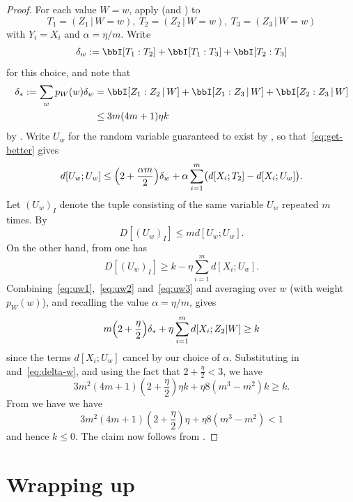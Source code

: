 \begin{proof}\leanok For each value $W=w$, apply  (and ) to
  \[
    T_1 = (Z_1 \,|\, W \mathop{=} w),\
    T_2 = (Z_2 \,|\, W \mathop{=} w),\
    T_3 = (Z_3 \,|\, W \mathop{=} w)
  \]
  with $Y_i=X_i$ and $\alpha=\eta/m$.  Write
  \[
    \delta_w :=  \bbI[T_1 : T_2] + \bbI[T_1 : T_3] + \bbI[T_2 : T_3]
  \]
  for this choice, and note that
  \begin{align}
    \label{eq:delta-w}
    \nonumber
    \delta_\ast := \sum_w p_W(w) \delta_w &= \bbI[Z_1 : Z_2 \,|\, W] + \bbI[Z_1 : Z_3 \,|\, W] + \bbI[Z_2 : Z_3 \,|\, W] \\
                           & \leq 3 m (4m+1) \eta k
  \end{align}
  by \Cref{prop:52}.
  Write $U_w$ for the random variable guaranteed to exist by ,
  so that~\eqref{eq:get-better} gives \begin{equation}
    \label{eq:uw1}
    d[U_w; U_w] \leq \Bigl( 2 + \frac{\alpha m}{2} \Bigr) \delta_w + \alpha \sum_{i=1}^m \bigl( d[X_i; T_2] - d[X_i; U_w] \bigr).
  \end{equation}
  Let $(U_w)_I$ denote the tuple consisting of the same variable $U_w$ repeated $m$ times.
  By 
  \begin{equation}
    \label{eq:uw2}
    D[(U_w)_I] \leq m d[U_w; U_w].
  \end{equation}
  On the other hand, from  one has
  \begin{equation}
    \label{eq:uw3}
    D[(U_w)_I] \geq k - \eta \sum_{i=1}^m d[X_i;U_w].
  \end{equation}
  Combining~\eqref{eq:uw1},~\eqref{eq:uw2} and~\eqref{eq:uw3} and averaging over $w$ (with weight $p_W(w)$), and recalling the value $\alpha=\eta/m$, gives
  \[
     m \Bigl( 2 + \frac{\eta}{2} \Bigr) \delta_\ast + \eta \sum_{i=1}^m d[X_i; Z_2 | W]
    \geq k
  \]
  since the terms $d[X_i; U_w]$ cancel by our choice of $\alpha$.
  Substituting in  and~\eqref{eq:delta-w}, and using the fact that $2 + \frac{\eta}{2} < 3$, we have
  \[
    3 m^2 (4m+1) (2+\frac{\eta}{2}) \eta k + \eta 8(m^3-m^2) k \geq k.
  \]
  From \Cref{eta-def-multi} we have we have
  $$ 3 m^2 (4m+1) (2+\frac{\eta}{2}) \eta + \eta 8(m^3-m^2) < 1$$
  and hence $k \leq 0$.  The claim now follows from .
\end{proof}

\section{Wrapping up}

